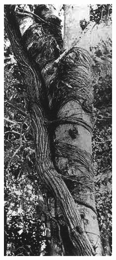 \begin{figure}[t]
	\begin{minipage}[t]{0.9\textwidth}
		\begin{minipage}[t]{(\textwidth-\fgap) * \real{0.422}}
			\centering
			\includegraphics[width=\textwidth]{graphics/fig_048}

\end{minipage}
\end{minipage}
\end{figure}
